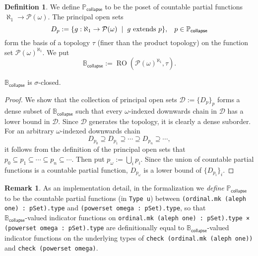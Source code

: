 \documentclass[sigplan,10pt,review, anonymous]{acmart}
\newcommand{\B}{\mathbb{B}}
\newcommand{\lil}{\lstinline}
\theoremstyle{definition}
\newtheorem{defn}{Definition}[section]
\newtheorem{remark}{Remark}[section]
\begin{document}
\begin{defn}\label{def:collapse-poset}
  We define \(\mathbb{P}_{\mathsf{collapse}}\) to be the poset of countable partial functions \(\aleph_1 \to \mathcal{P}(\omega)\).
  The principal open sets
  \[D_p := \{g : \aleph_1 \to \mathcal{P}(\omega) \hspace{2mm} | \hspace{2mm} g \text{ extends } p\} , \hspace{3mm} p \in \mathbb{P}_{\mathsf{collapse}}\]
  form the basis of a topology \(\tau\) (finer than the product topology) on the function set \(\mathcal{P}(\omega)^{\aleph_1}\).
  We put
  \[\B_{\mathsf{collapse}} := \operatorname{RO}\left(\mathcal{P}(\omega)^{\aleph_1}, \tau\right).\]
\end{defn}

\begin{lemma}\label{lemma:collapse-algebra-sigma-closed}
  \(\B_{\mathsf{collapse}}\) is \(\sigma\)-closed.
\end{lemma}

\begin{proof}
  We show that the collection of principal open sets \(\mathcal{D} := \{D_p\}_p\) forms a dense subset of
  \(\B_{\mathsf{collapse}}\) such that every $\omega$-indexed downwards chain in \(\mathcal{D}\) has a lower bound in \(\mathcal{D}\). Since \(\mathcal{D}\) generates the topology, it is clearly a dense suborder. For an arbitrary \(\omega\)-indexed downwards chain
  \[D_{p_0} \supseteq D_{p_1} \supseteq \cdots \supseteq D_{p_n} \supseteq \cdots,\]
  it follows from the definition of the principal open sets that $p_0 \subseteq p_1 \subseteq \cdots \subseteq p_n \subseteq \cdots$. Then put $p_\omega := \bigcup_i p_i$. Since the union of countable partial functions is a countable partial function, $D_{p_\omega}$ is a lower bound of $\{D_{p_i}\}_i$.
\end{proof}

\begin{remark}
  As an implementation detail, in the formalization we \emph{define} \(\mathbb{P}_{\mathsf{collapse}}\) to be the countable partial functions (in \lil{Type u}) between \lil{(ordinal.mk (aleph one) : pSet).type} and \lil{(powerset omega : pSet).type}, so that \\
  \(\mathbb{B}_{\mathsf{collapse}}\)-valued indicator functions on
  \lil{ordinal.mk (aleph one) : pSet).type × (powerset omega : pSet).type}
  are definitionally equal to \(\mathbb{B}_{\mathsf{collapse}}\)-valued indicator functions on the underlying types of \lil{check (ordinal.mk (aleph one))} and \lil{check (powerset omega)}.
\end{remark}
\end{document}
